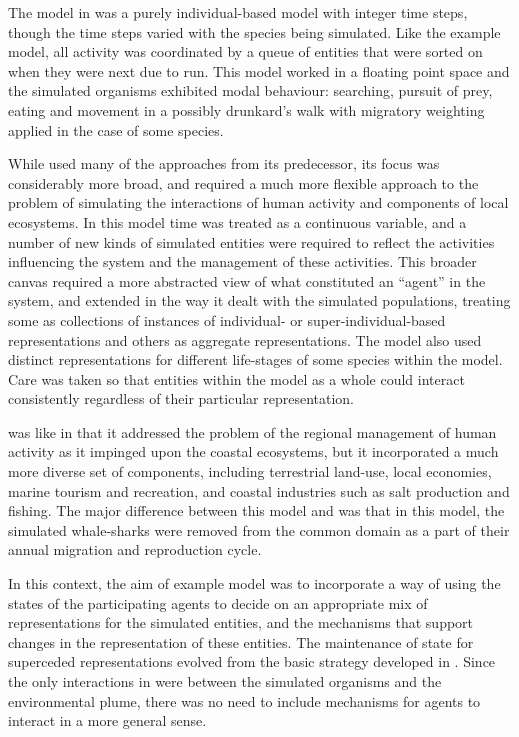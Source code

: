 The model in \cite{lyne1994pmez5} was a purely individual-based model
with integer time steps, though the time steps varied with the species
being simulated. Like the example model, all activity was coordinated
by a queue of entities that were sorted on when they were next due to
run. This model worked in a floating point space and the simulated
organisms exhibited modal behaviour: searching, pursuit of prey,
eating and movement in a possibly drunkard's walk with migratory
weighting applied in the case of some species.

While \cite{gray2006nws} used many of the approaches from its
predecessor, its focus was considerably more broad, and required a
much more flexible approach to the problem of simulating the
interactions of human activity and components of local ecosystems. In
this model time was treated as a continuous variable, and a number of
new kinds of simulated entities were required to reflect the
activities influencing the system and the management of these
activities. This broader canvas required a more abstracted view of
what constituted an ``agent'' in the system, and extended
\cite{lyne1994pmez5} in the way it dealt with the simulated
populations, treating some as collections of instances of individual-
or super-individual-based representations and others as aggregate
representations.  The model also used distinct representations for
different life-stages of some species within the model.  Care was
taken so that entities within the model as a whole could interact
consistently regardless of their particular representation.

\cite{gray2014} was like \cite{gray2006nws} in that it addressed the
problem of the regional management of human activity as it impinged
upon the coastal ecosystems, but it incorporated a much more diverse
set of components, including terrestrial land-use, local economies,
marine tourism and recreation, and coastal industries such as salt
production and fishing. The major difference between this model and
\cite{gray2006nws} was that in this model, the simulated whale-sharks were
removed from the common domain as a part of their annual migration and
reproduction cycle. 

In this context, the aim of example model was to incorporate a way of
using the states of the participating agents to decide on an
appropriate mix of representations for the simulated entities, and the
mechanisms that support changes in the representation of these
entities. The maintenance of state for superceded representations
evolved from the basic strategy developed in \Ctwo.  Since the only
interactions in \Ctwo were between the simulated organisms and the
environmental plume, there was no need to include mechanisms for
agents to interact in a more general sense.

